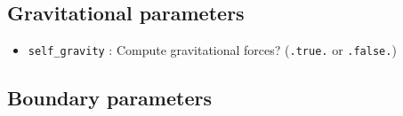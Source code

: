 \documentclass[a4paper]{article}
\newcommand{\var}[1]{\texttt{#1}}
\begin{document}
\subsection{Gravitational parameters}

\begin{itemize}

\item \var{self\_gravity} : Compute gravitational forces?   (\var{.true.} or \var{.false.})






\end{itemize}



\subsection{Boundary parameters}
\end{document}
